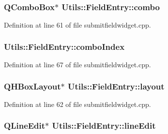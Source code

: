 \hypertarget{struct_utils_1_1_field_entry_abd2511ae13715dedb73f5eacf4228cb2}{
\subsubsection[{combo}]{\setlength{\rightskip}{0pt plus 5cm}Q\-Combo\-Box$\ast$ Utils\-::\-Field\-Entry\-::combo}}\label{struct_utils_1_1_field_entry_abd2511ae13715dedb73f5eacf4228cb2}


Definition at line 61 of file submitfieldwidget.\-cpp.

\hypertarget{struct_utils_1_1_field_entry_a98cf51959e982fb59e83a1185d5f382b}{
\subsubsection[{combo\-Index}]{ Utils\-::\-Field\-Entry\-::combo\-Index}}\label{struct_utils_1_1_field_entry_a98cf51959e982fb59e83a1185d5f382b}


Definition at line 67 of file submitfieldwidget.\-cpp.

\hypertarget{struct_utils_1_1_field_entry_a1e7b88dcc6013fd6eebdea1d52a0192b}{
\subsubsection[{layout}]{\setlength{\rightskip}{0pt plus 5cm}Q\-H\-Box\-Layout$\ast$ Utils\-::\-Field\-Entry\-::layout}}\label{struct_utils_1_1_field_entry_a1e7b88dcc6013fd6eebdea1d52a0192b}


Definition at line 62 of file submitfieldwidget.\-cpp.

\hypertarget{struct_utils_1_1_field_entry_a5fb5e049e448a5e053854ee97ae92e01}{
\subsubsection[{line\-Edit}]{\setlength{\rightskip}{0pt plus 5cm}Q\-Line\-Edit$\ast$ Utils\-::\-Field\-Entry\-::line\-Edit}}\label{struct_utils_1_1_field_entry_a5fb5e049e448a5e053854ee97ae92e01}


